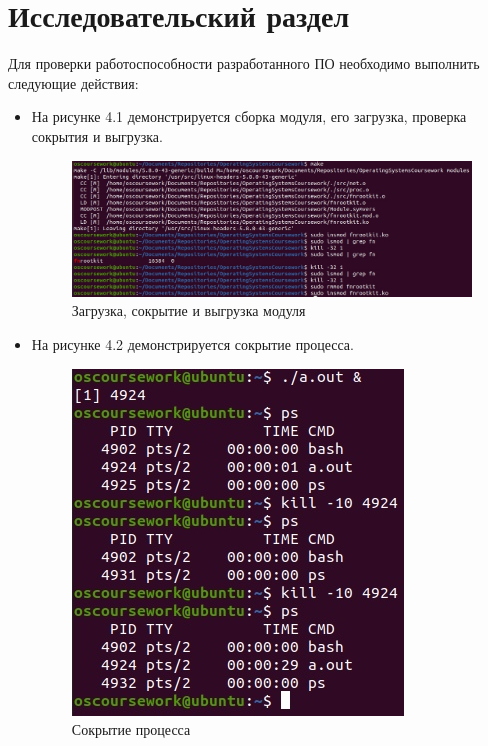 \chapter{Исследовательский раздел}

Для проверки работоспособности разработанного ПО необходимо выполнить следующие действия:

\begin{itemize}
	\item На рисунке 4.1 демонстрируется сборка модуля, его загрузка, проверка
	сокрытия и выгрузка.
	\begin{figure}[H]
		\centering
		\includegraphics[scale=0.4]{inc/img/scr_01.jpg}
		\caption{Загрузка, сокрытие и выгрузка модуля}\label{img:module_hide}
	\end{figure}


	\item На рисунке 4.2 демонстрируется сокрытие процесса.
	\begin{figure}[H]
		\centering
		\includegraphics[scale=0.65]{inc/img/scr_02.jpg}
		\caption{Сокрытие процесса}\label{img:proc_hide}
	\end{figure}


\end{itemize}

